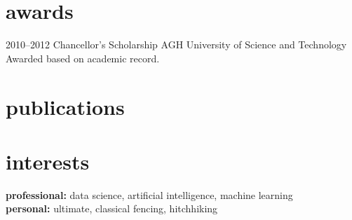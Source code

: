 \documentclass[]{friggeri-cv} %
\begin{document}

\section{awards}

\begin{entrylist}

\entry
{2010--2012}
{Chancellor's Scholarship}
{AGH University of Science and Technology}
{Awarded based on academic record.}


\end{entrylist}





\section{publications}



\section{interests}

\textbf{professional:} data science, artificial intelligence, machine learning \\ \textbf{personal:} ultimate, classical fencing, hitchhiking
\end{document}

